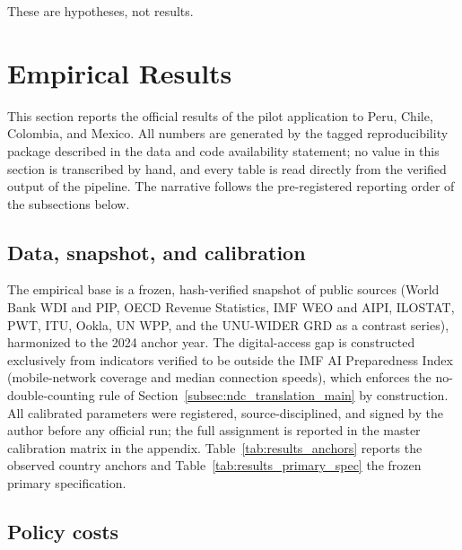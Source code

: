 \documentclass[11pt,a4paper]{article}
\begin{document}
These are hypotheses, not results.

\section{Empirical Results}\label{sec:empirical_results}

This section reports the official results of the pilot application to Peru, Chile, Colombia,
and Mexico. All numbers are generated by the tagged reproducibility package described in the
data and code availability statement; no value in this section is transcribed by hand, and
every table is read directly from the verified output of the pipeline. The narrative follows
the pre-registered reporting order of the subsections below.

\subsection{Data, snapshot, and calibration}\label{subsec:results_data}

The empirical base is a frozen, hash-verified snapshot of public sources (World Bank WDI and
PIP, OECD Revenue Statistics, IMF WEO and AIPI, ILOSTAT, PWT, ITU, Ookla, UN WPP, and the
UNU-WIDER GRD as a contrast series), harmonized to the 2024 anchor year. The digital-access
gap is constructed exclusively from indicators verified to be outside the IMF AI Preparedness
Index (mobile-network coverage and median connection speeds), which enforces the
no-double-counting rule of Section~\ref{subsec:ndc_translation_main} by construction. All
calibrated parameters were registered, source-disciplined, and signed by the author before
any official run; the full assignment is reported in the master calibration matrix in the
appendix. Table~\ref{tab:results_anchors} reports the observed country anchors and
Table~\ref{tab:results_primary_spec} the frozen primary specification.




\subsection{Policy costs}\label{subsec:results_costs}
\end{document}

